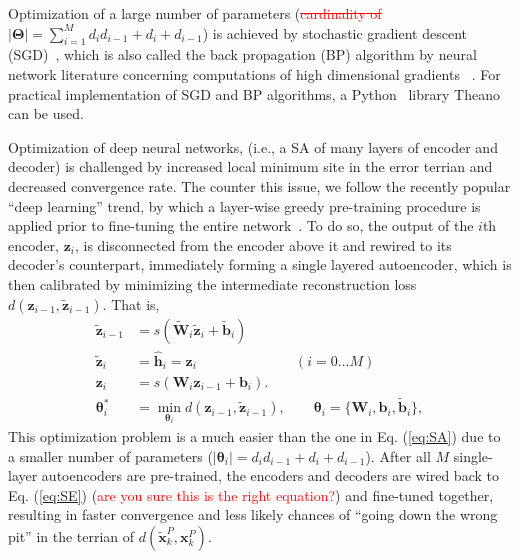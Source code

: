 \documentclass[11pt]{article}
\newcommand{\xdel}[1]{\textcolor{red}{\sout{#1}}}
\newcommand{\vecEC}[1]{\boldsymbol{#1}}
\newcommand{\vecDC}[1]{\boldsymbol{\tilde{#1}}}
\newcommand{\WEC}{\vecEC{W}}                   %
\newcommand{\WDC}{\vecDC{W}}                   %
\newcommand{\bEC}{\vecEC{b}}    %
\newcommand{\bDC}{\vecDC{b}}    %
\newcommand{\xEC}{\vecEC{x}}
\newcommand{\xDC}{\vecDC{x}}
\newcommand{\hHT}{\boldsymbol{\hat{h}}}
\newcommand{\zEC}{\vecEC{z}}
\newcommand{\zDC}{\vecDC{z}}
\newcommand{\Par}{\boldsymbol{\Theta}}
\newcommand{\pEC}{\boldsymbol{\theta}}
\begin{document}
Optimization of a large number of parameters (\xdel{cardinality of }$|\Par| = \sum_{i=1}^M{d_i d_{i-1} + d_i + d_{i-1}}$) is achieved by stochastic gradient descent (SGD)~\citep{SGD1, SGD2}, which is also called the back propagation (BP) algorithm by neural network literature concerning computations of high dimensional gradients ~\citep{BP1, BP2, BP3}. For practical implementation of SGD and BP algorithms, a Python~\citep{python1} library Theano~\citep{Theano1} can be used.

Optimization of deep neural networks, (i.e., a SA of many layers of encoder and decoder) is challenged by increased local minimum site in the error terrian and decreased convergence rate. The counter this issue, we follow the recently popular ``deep learning'' trend, by which a layer-wise greedy pre-training procedure is applied prior to fine-tuning the entire network~\citep{DL:DBN1, DL:SDA1}. To do so, the output of the $i$th encoder, $\zEC_i$, is disconnected from the encoder above it and rewired to its decoder's counterpart, immediately forming a single layered autoencoder, which is then calibrated by minimizing the intermediate reconstruction loss $d(\zEC_{i-1}, \zDC_{i-1})$. That is,
\begin{equation}\label{eq:Greedy}
  \begin{split}
    \zDC_{i-1} &= s(\WDC_i \zDC_i + \bDC_i) \\
    \zDC_{i  } &= \hHT_i = \zEC_i \quad \qquad \qquad \qquad (i = 0 \dots M) \\
    \zEC_{i  } &= s(\WEC_i\zEC_{i-1} + \bEC_i). \\
    \pEC_i^* &= \min_{\pEC_i}{d(\zEC_{i-1}, \zDC_{i-1})}, \qquad \pEC_i = \{\WEC_i, \bEC_i, \bDC_i\},
  \end{split}
\end{equation}
This optimization problem is a much easier than the one in Eq. (\ref{eq:SA}) due to a smaller number of parameters ($|\pEC_i|=d_i d_{i-1} + d_i + d_{i-1}$). After all $M$ single-layer autoencoders are pre-trained, the encoders and decoders are wired back to Eq. (\ref{eq:SE}) (\textcolor{red}{are you sure this is the right equation?}) and fine-tuned together, resulting in faster convergence and less likely chances of ``going down the wrong pit'' in the terrian of $d(\xDC_k^P, \xEC_k^P)$.

\end{document}
